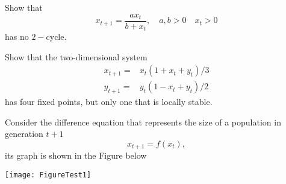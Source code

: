 \documentclass[12pt]{exam}
\begin{document}
\begin{questions}


\question[8]
Show that 
$$ x_{t+1}=\frac{ax_t}{b +x_t}, \quad a,b>0 \quad x_t>0$$
has no $2-$cycle.





\question[17]
Show that the two-dimensional system
$$
\begin{array}{ll}
x_{t+1}=&x_{t}(1+x_{t}+y_{t})/3\\
y_{t+1}=&y_{t}(1-x_{t}+y_{t})/2
\end{array}
$$
has four fixed points, but only one that is locally stable.


\question[10]
Consider the difference equation that represents the size of a population in generation $t+1$ 
$$x_{t+1}=f(x_t),$$
its graph is shown in the Figure below
\begin{center}
\texttt{[image: FigureTest1]}
\end{center}



\end{questions}
\end{document}
